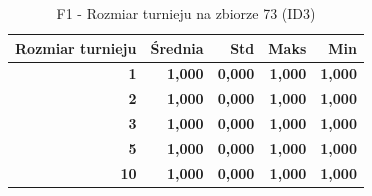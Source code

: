 \begin{table}[htbp]
\centering
\small
\setlength{\tabcolsep}{6pt}
\renewcommand{\arraystretch}{1.2}
\caption{F1 - Rozmiar turnieju na zbiorze 73 (ID3)}
\label{tab:ID3_tournament_size_73_f1}
\begin{tabular}{r|r|r|r|r}
\toprule
Rozmiar turnieju & Średnia & Std & Maks & Min \\
\hline
\textbf{1} & \textbf{1,000} & \textbf{0,000} & \textbf{1,000} & \textbf{1,000} \\
\textbf{2} & \textbf{1,000} & \textbf{0,000} & \textbf{1,000} & \textbf{1,000} \\
\textbf{3} & \textbf{1,000} & \textbf{0,000} & \textbf{1,000} & \textbf{1,000} \\
\textbf{5} & \textbf{1,000} & \textbf{0,000} & \textbf{1,000} & \textbf{1,000} \\
\textbf{10} & \textbf{1,000} & \textbf{0,000} & \textbf{1,000} & \textbf{1,000} \\
\bottomrule
\end{tabular}
\end{table}